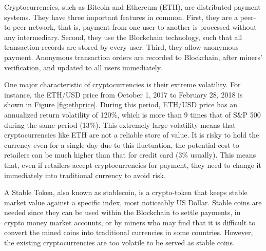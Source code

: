 \documentclass[final,pdftex]{ectaart}
\theoremstyle{plain}
\begin{document}
Cryptocurrencies, such as Bitcoin and Ethereum (ETH), are distributed payment systems. They have three important features in common. First, they are a peer-to-peer network, that is, payment from one user to another is processed without any intermediary. Second, they use the Blockchain technology, such that all transaction records are stored by every user. Third, they allow anonymous payment. Anonymous transaction orders are recorded to Blockchain, after miners' verification, and updated to all users immediately.

One major characteristic of cryptocurrencies is their extreme volatility. For instance, the ETH/USD price from October 1, 2017 to February 28, 2018 is shown in Figure \ref{fig:ethprice}. During this period, ETH/USD price has an annualized return volatility of 120\%, which is more than 9 times that of S\&P 500 during the same period (13\%). This extremely large volatility means that cryptocurrencies like ETH are not a reliable store of value. It is risky to hold the currency even for a single day due to this fluctuation, the potential cost to retailers can be much higher than that for credit card (3\% usually). This means that, even if retailers accept cryptocurrencies for payment, they need to change it immediately into traditional currency to avoid risk.


A Stable Token, also known as stablecoin, is a crypto-token that keeps stable market value against a specific index, most noticeably US Dollar. Stable coins are needed since they can be used within the Blockchain to settle payments, in crypto money market accounts, or by miners who may find that it is difficult to convert the mined coins into traditional currencies in some countries. However, the existing cryptocurrencies are too volatile to be served as stable coins.
\end{document}
